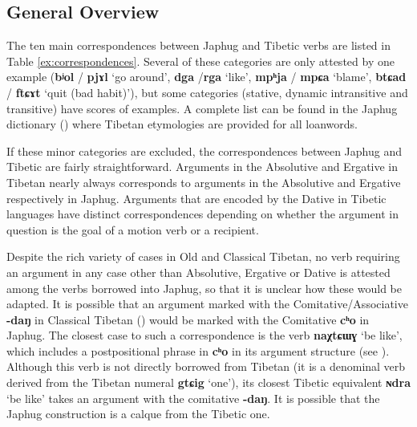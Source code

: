 \documentclass[oneside,a4paper,11pt]{article}
\newcommand{\ipa}[1]{{\phon\textbf{\mbox{#1}}}} %
\begin{document}
\subsection{General Overview}
The ten main correspondences between Japhug and Tibetic verbs are listed in Table \ref{ex:correspondences}. Several of these categories are only attested by one example (\ipa{bʲol} / \ipa{pjɤl} `go around', \ipa{dga} /\ipa{rga} `like', \ipa{mpʰja} / \ipa{mpɕa} `blame', \ipa{btɕad} / \ipa{ftɕɤt} `quit (bad habit)'), but some categories (stative, dynamic intransitive and transitive) have scores of examples. A complete list can be found in the Japhug dictionary (\citealt{jacques15japhug}) where Tibetan etymologies are provided for all loanwords.

If these minor categories are excluded, the correspondences between Japhug and Tibetic are fairly straightforward. Arguments in the Absolutive and Ergative in Tibetan nearly always corresponds to arguments in the Absolutive and Ergative respectively in Japhug. Arguments that are encoded by the Dative in Tibetic languages have distinct correspondences depending on whether the argument in question is the goal of a motion verb or a recipient.

Despite the rich variety of cases in Old and Classical Tibetan, no verb requiring an argument in any case other than Absolutive, Ergative or Dative is attested among the verbs borrowed into Japhug, so that it is unclear how these would be adapted. It is possible that an argument marked with the Comitative/Associative \ipa{-daŋ} in Classical Tibetan (\citealt{tournadre10cases, hill12bas}) would be marked with the Comitative \ipa{cʰo} in Japhug. The closest case to such a correspondence is the verb \ipa{naχtɕɯɣ} `be like', which includes a postpositional phrase in \ipa{cʰo} in its argument structure (see \citealt[273]{jacques14linking}). Although this verb is not directly borrowed from Tibetan (it is a denominal verb derived from the Tibetan numeral \ipa{gtɕig} `one'), its closest Tibetic equivalent \ipa{ɴdra} `be like' takes an argument with the comitative \ipa{-daŋ}. It is possible that the Japhug construction is a calque from the Tibetic one.
\end{document}
